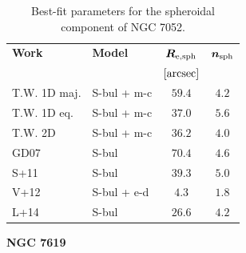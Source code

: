 \documentclass[preprint2]{emulateapj}
\begin{document}
  \begin{table}[h]
  \small
  \caption{Best-fit parameters for the spheroidal component of NGC 7052.}
  \begin{center}
  \begin{tabular}{llcc}
  \hline
  {\bf Work} & {\bf Model}   & $\bm R_{\rm e,sph}$    & $\bm n_{\rm sph}$ \\
    &  &  $[\rm arcsec]$ & \\
  \hline
  T.W. 1D maj. & S-bul + m-c & $59.4$  &  $4.2$ \\
  T.W. 1D eq.  & S-bul + m-c & $37.0$  &  $5.6$ \\
  T.W. 2D      & S-bul + m-c & $36.2$  &  $4.0$ \\
  \hline
  GD07      & S-bul & $70.4$  &  $4.6$ \\
  S+11      & S-bul & $39.3$  &  $5.0$ \\
  V+12      & S-bul + e-d & $4.3$  &  $1.8$ \\
  L+14      & S-bul & $26.6$  &  $4.2$ \\
  \hline
  \end{tabular}
  \end{center}
  \label{tab:n7052}
  \end{table}


  \clearpage\newpage\noindent
  {\bf NGC 7619 \\}
\end{document}
